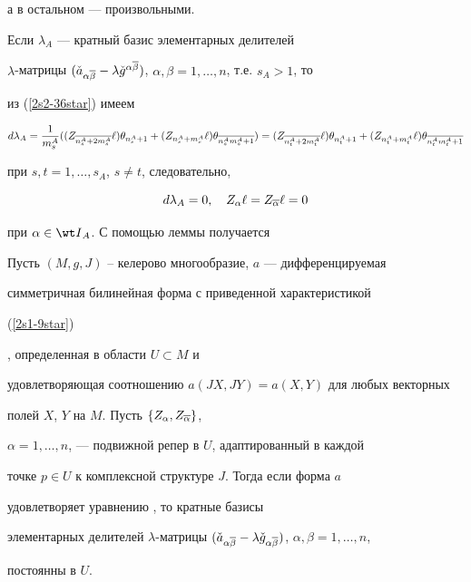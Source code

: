а в остальном --- произвольными.





Если $\lambda_A$ --- кратный базис элементарных делителей


$\lambda$-матрицы $(\Check a_{\alpha\ol\beta} - \lambda \Check


g^{\alpha\ol\beta})$, $\alpha, \beta=1,\dotsc,n$, т.е. $s_A > 1$, то


из (\ref{2s2-36star}) имеем


$$


d\lambda_A = \frac{1}{m^A_s}


((Z_{\ol {n^A_s + 2m^A_s}}\ell)\theta_{n_s^A +1} +


(Z_{n^A_s +m^A_s} \ell)\theta_{\ol {n^A_s m^A_s +1}}) =


(Z_{\ol {n^A_t + 2m^A_t}}\ell)\theta_{n_t^A +1} +


(Z_{n^A_t +m^A_t} \ell)\theta_{\ol {n^A_t m^A_t +1}}


$$


при $s,t =1,\dotsc,s_A$, $s\neq t$, следовательно,


\begin{equation}\label{2s2-46}


d\lambda_A = 0, \quad Z_\alpha \ell =Z_{\ol\alpha} \ell = 0


\end{equation}


при $\alpha \in \wt I{}_A$. С помощью леммы получается





\begin{thm}\label{2s2-th1}


Пусть $(M,g,J)$ -- келерово многообразие, $a$ --- дифференцируемая


симметричная билинейная форма с приведенной характеристикой {\rom


{(\ref{2s1-9star})}}, определенная в области $U \subset M$ и


удовлетворяющая соотношению $a(JX,JY)=a(X,Y)$ для любых векторных


полей $X$, $Y$ на $M$. Пусть $\{ Z_\alpha,Z_{\overline\alpha}\}$,


$\alpha=1,\dotsc,n$, --- подвижной репер в $U$, адаптированный в каждой


точке $p\in U$ к комплексной структуре $J$. Тогда если форма $a$


удовлетворяет уравнению {\rom {(\ref{2s2-1})}}, то кратные базисы


элементарных делителей $\lambda$-матрицы $(\Check a_{\alpha\ol\beta} -


\lambda \Check g_{\alpha\ol\beta})$, $\alpha,\beta=1,\dotsc,n$,


постоянны в $U$.


\end{thm}





